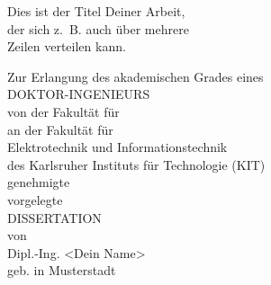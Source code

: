 \begin{titlepage}
 \parindent0cm
\begin{center}

\begin{minipage}[c]{16.5cm}
\begin{center}
   {\LARGE
   \begin{bf}
   \hspace{-1cm}
     Dies ist der Titel Deiner Arbeit,\\
   \hspace{-1cm}
     der sich z.~B. auch \"uber mehrere\\
   \hspace{-1cm}
      Zeilen verteilen kann.\\
    \end{bf}
	}
\end{center}
\end{minipage}

    \vspace{2.5cm}
    {\large Zur Erlangung des akademischen Grades eines}\\
    
    \vspace{1.2cm}
     {\Large DOKTOR-INGENIEURS}\\
    \vspace{1.2cm}
    \ifdissforprint
   		{\large von der Fakult\"at f\"ur}\\ %
   	\else
   		{\large an der Fakult\"at f\"ur}\\ %
   	\fi
    \vspace{0.4cm}
    {\large Elektrotechnik und Informationstechnik}\\
    \vspace{0.4cm}
    {\large des Karlsruher Instituts f\"ur Technologie (KIT) }\\
    \vspace{0.8cm}
    \ifdissforprint
    		{\large genehmigte }\\ %
   	\else
    		{\large vorgelegte }\\ %
   	\fi
    \vspace{1.2cm}
    {\Large DISSERTATION}\\
    \vspace{1.2cm}
    {\large von }\\
    \vspace{0.8cm}
    {\large Dipl.-Ing. <Dein Name>}\\
    \vspace{0.4cm}
    {\large geb. in Musterstadt}\\
    \ifdissforprint
    		 \vspace{2.1cm}
   	\else
    		 \vspace{2.5cm}
   	\fi
   


\end{center}
\end{titlepage}
